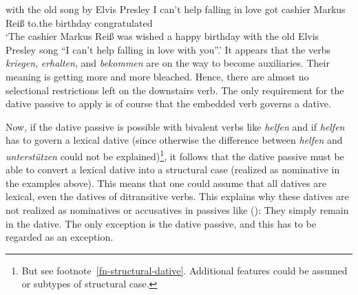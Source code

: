      with the old song   by  Elvis Presley \hphantom{"`}I can't help falling in love got cashier Markus Reiß to.the birthday congratulated\\
\glt `The cashier Markus Reiß was wished a happy birthday with the old Elvis Presley song ``I can't help falling in love with you''.'
\zl
It appears that the verbs \emph{kriegen}, \emph{erhalten}, and \emph{bekommen} are on the way to become
auxiliaries. Their meaning is getting more and more bleached. Hence, there are almost no selectional
restrictions left on the downstairs verb. The only requirement for the dative passive to apply is of
course that the embedded verb governs a dative.

Now, if the dative passive is possible with bivalent verbs like \emph{helfen} and if \emph{helfen}
has to govern a lexical dative (since otherwise the difference between \emph{helfen} and
\emph{unterstützen} could not be explained)\footnote{%
  But see footnote~\ref{fn-structural-dative}. Additional features could be assumed or subtypes of
  structural case.}, 
it follows that the dative passive must be able to
convert a lexical dative into a structural case (realized as nominative in the examples above). This
means that one could assume that all datives are lexical, even the datives of ditransitive
verbs. This explains why these datives are not realized as nominatives or accusatives in passives
like ():
\eal
{}
\zl
They simply remain in the dative. The only exception is the dative passive, and this has to be regarded as an exception.%
%


